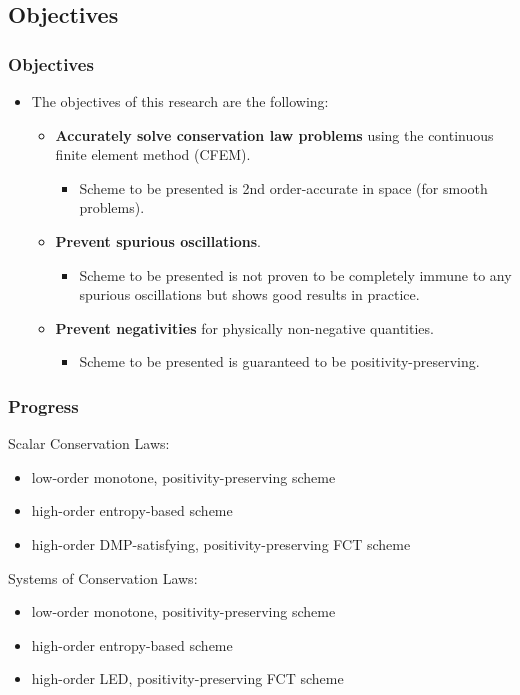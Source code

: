 \documentclass{beamer}
\begin{document}
\subsection{Objectives}
\begin{frame}
\frametitle{Objectives}

\begin{itemize}
   \item The objectives of this research are the following:
   \begin{itemize}
      \item \textbf{Accurately solve conservation law problems} using the
         continuous finite element method (CFEM).
      \begin{itemize}
         \item Scheme to be presented is 2nd order-accurate in space (for smooth
            problems).
      \end{itemize}
      \item \textbf{Prevent spurious oscillations}.
      \begin{itemize}
	 \item Scheme to be presented is not proven to be completely immune to any
            spurious oscillations but shows good results in practice.
      \end{itemize}
      \item \textbf{Prevent negativities} for physically non-negative quantities.
      \begin{itemize}
         \item Scheme to be presented is guaranteed to be positivity-preserving.
      \end{itemize}
   \end{itemize}
\end{itemize}

\end{frame}
\begin{frame}
\frametitle{Progress}

Scalar Conservation Laws:
\begin{itemize}
\item[] \checked low-order monotone, positivity-preserving scheme
\item[] \checked high-order entropy-based scheme
\item[] \checked high-order DMP-satisfying, positivity-preserving FCT scheme
\end{itemize}

Systems of Conservation Laws:
\begin{itemize}
\item[] \checked low-order monotone, positivity-preserving scheme
\item[] \checked high-order entropy-based scheme
\item[] \unchecked high-order LED, positivity-preserving FCT scheme
\end{itemize}

\end{frame}
\end{document}
